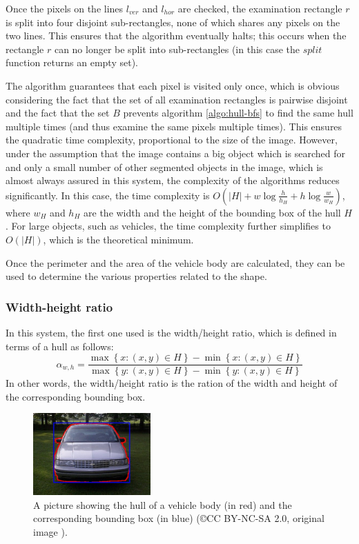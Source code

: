 \documentclass[times, utf8, zavrsni]{fer}
\begin{document}
Once the pixels on the lines $l_{ver}$ and $l_{hor}$ are checked, the
examination rectangle $r$ is split into four disjoint sub-rectangles, none of
which shares any pixels on the two lines. This ensures that the algorithm
eventually halts; this occurs when the rectangle $r$ can no longer be split into
sub-rectangles (in this case the $split$ function returns an empty set).

The algorithm guarantees that each pixel is visited only once, which is obvious
considering the fact that the set of all examination rectangles is pairwise
disjoint and the fact that the set $B$ prevents algorithm \ref{algo:hull-bfs} to
find the same hull multiple times (and thus examine the same pixels multiple
times). This ensures the quadratic time complexity, proportional to the size of
the image. However, under the assumption that the image contains a big object
which is searched for and only a small number of other segmented objects in the
image, which is almost always assured in this system, the complexity of the
algorithms reduces significantly. In this case, the time complexity is $O(|H| +
w\log{\frac{h}{h_H}} + h\log{\frac{w}{w_H}})$, where $w_H$ and $h_H$ are the
width and the height of the bounding box of the hull $H$. For large objects,
such as vehicles, the time complexity further simplifies to $O(|H|)$, which is
the theoretical minimum.

Once the perimeter and the area of the vehicle body are calculated, they can be
used to determine the various properties related to the shape.

\subsubsection{Width-height ratio}
In this system, the first one used is the width/height ratio, which is defined
in terms of a hull as follows: \[ \alpha_{w,h} = \frac{\max{\left\{ x : (x, y)
\in H \right\}} - \min{\left\{ x : (x, y) \in H \right\}}} {\max{\left\{ y : (x,
y) \in H \right\}} - \min{\left\{ y : (x, y) \in H \right\}}} \] In other words,
the width/height ratio is the ration of the width and height of the
corresponding bounding box.

\begin{figure}[htb]
\caption{A picture showing the hull of a vehicle body (in red) and the
corresponding bounding box (in blue) (\copyright CC BY-NC-SA 2.0, original
image \citep{image:shape-01}).}
\centering
\includegraphics[width=0.4\textwidth]{images/shape-01}
\end{figure}
\end{document}
